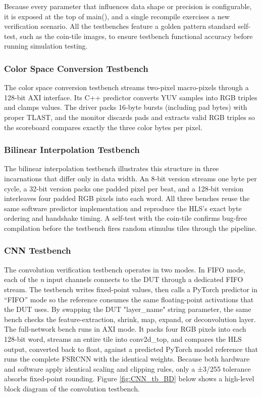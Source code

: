 \documentclass{article}
\begin{document}
    \par Because every parameter that influences data shape or precision is configurable, it is exposed at the top of main(), and a single recompile exercises a new verification scenario. All the testbenches feature a golden pattern standard self-test, such as the coin-tile images, to ensure testbench functional accuracy before running simulation testing.

        \subsubsection{Color Space Conversion Testbench}
        \noindent The color space conversion testbench streams two-pixel macro-pixels through a 128-bit AXI interface. Its C++ predictor converts YUV samples into RGB triples and clamps values. The driver packs 16‑byte bursts (including pad bytes) with proper TLAST, and the monitor discards pads and extracts valid RGB triples so the scoreboard compares exactly the three color bytes per pixel.

        \subsubsection{Bilinear Interpolation Testbench}
        \noindent The bilinear interpolation testbench illustrates this structure in three incarnations that differ only in data width. An 8‑bit version streams one byte per cycle, a 32‑bit version packs one padded pixel per beat, and a 128‑bit version interleaves four padded RGB pixels into each word. All three benches reuse the same software predictor implementation and reproduce the HLS’s exact byte ordering and handshake timing. A self-test with the coin-tile confirms bug-free compilation before the testbench fires random stimulus tiles through the pipeline.

        \subsubsection{CNN Testbench}
        \noindent The convolution verification testbench operates in two modes. In FIFO mode, each of the \textit{n} input channels connects to the DUT through a dedicated FIFO stream. The testbench writes fixed-point values, then calls a PyTorch predictor in “FIFO” mode so the reference consumes the same floating-point activations that the DUT uses. By swapping the DUT "layer\_name" string parameter, the same bench checks the feature-extraction, shrink, map, expand, or deconvolution layer. The full‑network bench runs in AXI mode. It packs four RGB pixels into each 128-bit word, streams an entire tile into conv2d\_top, and compares the HLS output, converted back to float, against a predicted PyTorch model reference that runs the complete FSRCNN with the identical weights. Because both hardware and software apply identical scaling and clipping rules, only a ±3/255 tolerance absorbs fixed-point rounding. Figure \ref{fig:CNN_tb_BD} below shows a high-level block diagram of the convolution testbench.
\end{document}
